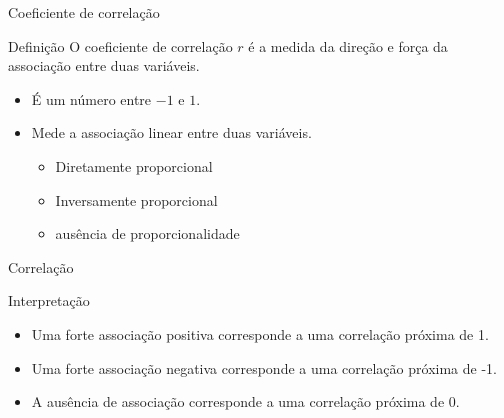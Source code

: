 \documentclass{beamer}
\begin{document}
\begin{frame}{\scriptsize Coeficiente de correlação}
  \begin{block}{Definição}
    \small
    O coeficiente de correlação $r$ é a medida da direção e força da
    associação entre duas variáveis.
  \end{block}
  \bigskip
  \bigskip
  \begin{itemize}
    \footnotesize
  \item É um número entre $-1$ e $1$.
    \bigskip
  \item Mede a associação \alert{linear} entre duas variáveis.
    \begin{itemize}
      \tiny
    \item Diretamente proporcional
    \item Inversamente proporcional
    \item ausência de proporcionalidade
    \end{itemize}
  \end{itemize}
\end{frame}


\begin{frame}{\scriptsize Correlação}
  \begin{block}{Interpretação}
    \footnotesize
    \begin{itemize}
    \footnotesize
    \item Uma forte associação \alert<2>{positiva} corresponde a uma correlação
      próxima de \alert<2>{1}.
      \bigskip
    \item Uma forte associação \alert<3>{negativa} corresponde a uma correlação
      próxima de \alert<3>{-1}.
      \bigskip
    \item A \alert<4>{ausência} de associação corresponde a uma
      correlação próxima de \alert<4>{0}.
    \end{itemize}
  \end{block}
\end{frame}
\end{document}
